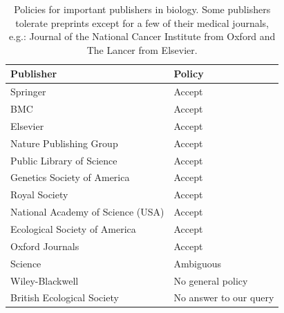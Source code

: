 \documentclass[letterpaper,twocolumn,superscriptaddress,showkeys]{revtex4-1}
\begin{document}
\begin{table}
    \centering
    \begin{tabular}{|ll|}
    \hline
    Publisher                                   & Policy \\
    \hline
    Springer                            	& Accept \\
    BMC                                 	& Accept \\
    Elsevier                            	& Accept \\
    Nature Publishing Group             	& Accept \\
    Public Library of Science           	& Accept \\
    Genetics Society of America                 & Accept \\
    Royal Society                       	& Accept \\
    National Academy of Science (USA)           & Accept \\
    Ecological Society of America       	& Accept \\
    Oxford Journals                             & Accept \\
    Science                             	& Ambiguous \\
    Wiley-Blackwell                       	& No general policy \\
    British Ecological Society                  & No answer to our query \\
    \hline
    \end{tabular}
    \caption{Policies for important publishers in biology. Some publishers
tolerate preprints except for a few of their medical journals, e.g.: Journal
of the National Cancer Institute from Oxford and The Lancer from Elsevier.}
    \label{table:policies}
\end{table}


\end{document}
